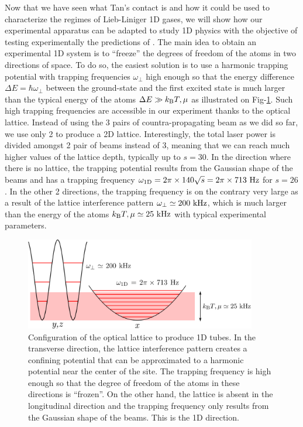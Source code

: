 Now that we have seen what Tan's contact is and how it could be used to characterize the regimes of Lieb-Liniger 1D gases, we will show how our experimental apparatus can be adapted to study 1D physics with the objective of testing experimentally the predictions of \cite{yao2018tan}. The main idea to obtain an  experimental 1D system is to ``freeze'' the degrees of freedom of the atoms in two directions of space. To do so, the easiest solution is to use a harmonic trapping potential with trapping frequencies $\omega_{\perp}$ high enough so that the energy difference $\Delta E =\hbar \omega_{\perp}$ between the ground-state and the first excited state is much larger than the typical energy of the atoms $\Delta E \gg k_{\mathrm{B}} T, \mu$ as illustrated on Fig-\ref{fig:1D_config}. Such high trapping frequencies are accessible in our experiment thanks to the optical lattice. Instead of using the 3 pairs of countra-propagating beam as we did so far, we use only 2 to produce a 2D lattice. Interestingly, the total laser power is divided amongst 2 pair of beams instead of 3, meaning that we can reach much higher values of the lattice depth, typically up to $s=30$. In the direction where there is no lattice, the trapping potential results from the Gaussian shape of the beams and has a trapping frequency $\omega_{\rm{1D}} =2 \pi \times 140 \sqrt{s} = 2 \pi  \times 713 \ \rm{Hz}$ for $s=26$. In the other 2 directions, the trapping frequency is on the contrary very large as a result of the lattice interference pattern $\omega_{\perp} \simeq 200 \ \rm{kHz}$, which is much larger than the energy of the atoms $k_{\mathrm{B}} T, \mu \simeq 25 \ \rm{kHz}$ with typical experimental parameters.

\begin{figure}
    \centering
    \includegraphics[width=0.9\textwidth]{Fig/Chapter5/1D_config.png}
    \caption[Configuration of the optical lattice to produce 1D tubes]{Configuration of the optical lattice to produce 1D tubes. In the transverse direction, the lattice interference pattern creates a confining potential that can be approximated to a harmonic potential near the center of the site. The trapping frequency is high enough so that the degree of freedom of the atoms in these directions is ``frozen''. On the other hand, the lattice is absent in the longitudinal direction and the trapping frequency only results from the Gaussian shape of the beams. This is the 1D direction.}
    \label{fig:1D_config}
\end{figure}


